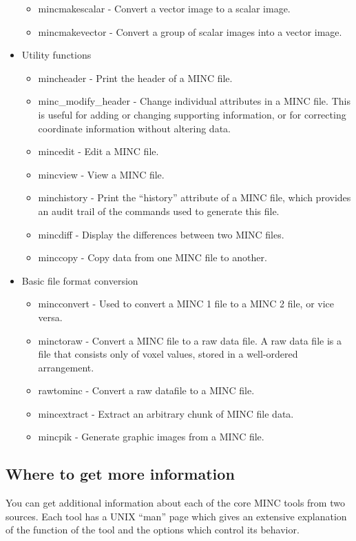 \documentclass{article}
\begin{document}
\begin{itemize}
\begin{itemize}
\item mincmakescalar - Convert a vector image to a scalar image.
\item mincmakevector - Convert a group of scalar images into a vector image.
\end{itemize}
\item Utility functions
\begin{itemize}
\item mincheader - Print the header of a MINC file.
\item minc\_modify\_header - Change individual attributes in a MINC file. This
is useful for adding or changing supporting information, or for correcting
coordinate information without altering data.
\item mincedit - Edit a MINC file.
\item mincview - View a MINC file.
\item minchistory - Print the ``history'' attribute of a MINC file, which
provides an audit trail of the commands used to generate this file.
\item mincdiff - Display the differences between two MINC files.
\item minccopy - Copy data from one MINC file to another.
\end{itemize}
\item Basic file format conversion
\begin{itemize}
\item mincconvert - Used to convert a MINC 1 file to a MINC 2 file, or
vice versa.
\item minctoraw - Convert a MINC file to a raw data file.  A raw data file
is a file that consists only of voxel values, stored in a well-ordered
arrangement.
\item rawtominc - Convert a raw datafile to a MINC file.
\item mincextract - Extract an arbitrary chunk of MINC file data.
\item mincpik - Generate graphic images from a MINC file.
\end{itemize}
\end{itemize}
\subsection{Where to get more information}
You can get additional information about each of the core MINC tools from
two sources.  Each tool has a UNIX ``man'' page which gives an extensive
explanation of the function of the tool and the options which control its
behavior.
\end{document}
